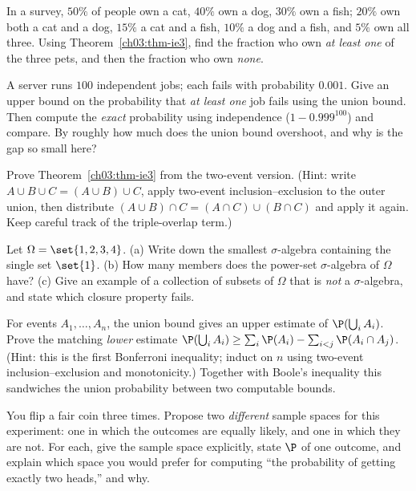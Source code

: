 \begin{exercise}
\label{ch03:exr-ie3}
In a survey, $50\%$ of people own a cat, $40\%$ own a dog, $30\%$ own a fish;
$20\%$ own both a cat and a dog, $15\%$ a cat and a fish, $10\%$ a dog and a fish,
and $5\%$ own all three. Using Theorem~\ref{ch03:thm-ie3}, find the fraction who
own \emph{at least one} of the three pets, and then the fraction who own
\emph{none}.
\end{exercise}

\begin{exercise}
\label{ch03:exr-union-bound}
A server runs $100$ independent jobs; each fails with probability $0.001$. Give
an upper bound on the probability that \emph{at least one} job fails using the
union bound. Then compute the \emph{exact} probability using independence
($1 - 0.999^{100}$) and compare. By roughly how much does the union bound
overshoot, and why is the gap so small here?
\end{exercise}

\begin{exercise}
\label{ch03:exr-prove-ie3}
Prove Theorem~\ref{ch03:thm-ie3} from the two-event version. (Hint: write
$A \cup B \cup C = (A \cup B) \cup C$, apply two-event inclusion--exclusion to the
outer union, then distribute $(A\cup B)\cap C = (A\cap C)\cup(B\cap C)$ and apply
it again. Keep careful track of the triple-overlap term.)
\end{exercise}

\begin{exercise}
\label{ch03:exr-sigma}
Let $\Omega = \set{1,2,3,4}$. (a) Write down the smallest $\sigma$-algebra
containing the single set $\set{1}$. (b) How many members does the power-set
$\sigma$-algebra of $\Omega$ have? (c) Give an example of a collection of subsets
of $\Omega$ that is \emph{not} a $\sigma$-algebra, and state which closure
property fails.
\end{exercise}

\begin{exercise}
\label{ch03:exr-sandwich}
For events $A_1, \dots, A_n$, the union bound gives an upper estimate of
$\P(\bigcup_i A_i)$. Prove the matching \emph{lower} estimate
$\P(\bigcup_i A_i) \ge \sum_i \P(A_i) - \sum_{i<j}\P(A_i \cap A_j)$. (Hint: this
is the first Bonferroni inequality; induct on $n$ using two-event
inclusion--exclusion and monotonicity.) Together with Boole's inequality this
sandwiches the union probability between two computable bounds.
\end{exercise}

\begin{exercise}
\label{ch03:exr-conceptual}
You flip a fair coin three times. Propose two \emph{different} sample spaces for
this experiment: one in which the outcomes are equally likely, and one in which
they are not. For each, give the sample space explicitly, state $\P$ of one
outcome, and explain which space you would prefer for computing ``the probability
of getting exactly two heads,'' and why.
\end{exercise}
